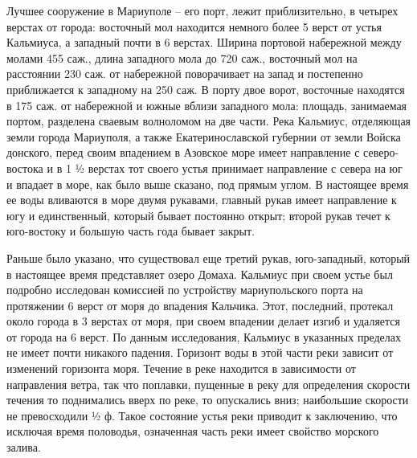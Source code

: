 Лучшее сооружение в Мариуполе – его порт, лежит приблизительно, в четырех
верстах от города: восточный мол находится немного более 5 верст от устья
Кальмиуса, а западный почти в 6 верстах. Ширина портовой набережной между
молами 455 саж., длина западного мола до 720 саж., восточный мол на расстоянии
230 саж. от набережной поворачивает на запад и постепенно приближается к
западному на 250 саж. В порту двое  ворот, восточные находятся в 175 саж. от
набережной и южные вблизи западного мола: площадь, занимаемая портом, разделена
сваевым волноломом на две части. Река Кальмиус, отделяющая земли города
Мариуполя, а также Екатеринославской губернии от земли Войска донского, перед
своим впадением в Азовское море имеет направление с северо-востока и в 1 ½
верстах тот своего устья принимает направление с севера на юг и впадает в море,
как было выше сказано, под прямым углом. В настоящее время ее воды вливаются в
море двумя рукавами, главный рукав имеет направление к югу и единственный,
который бывает постоянно открыт; второй рукав течет к юго-востоку и большую
часть года бывает закрыт. 

Раньше было указано, что существовал еще третий
рукав, юго-западный, который в настоящее время представляет озеро Домаха.
Кальмиус при своем устье был подробно исследован комиссией по устройству
мариупольского порта на протяжении 6 верст от моря до впадения Кальчика. Этот,
последний, протекал около города в 3 верстах от моря, при своем впадении делает
изгиб и удаляется от города на 6 верст. По данным исследования, Кальмиус в
указанных пределах не имеет почти никакого падения. Горизонт воды в этой части
реки зависит от изменений горизонта моря. Течение в реке находится в
зависимости от направления ветра, так что поплавки, пущенные в реку для
определения скорости течения то поднимались вверх по реке, то опускались вниз;
наибольшие скорости не превосходили ½ ф. Такое состояние устья реки приводит к
заключению, что исключая время половодья, означенная часть  реки имеет свойство
морского залива.

